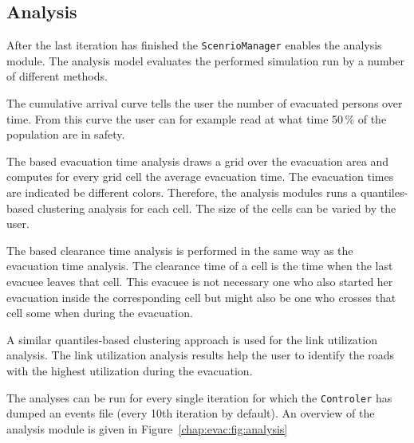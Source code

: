 \subsection{Analysis}
After the last iteration has finished the \lstinline|ScenrioManager| enables the analysis module. The analysis model evaluates the performed simulation run by a number of different methods. 
\begin{compactitem}
\item The cumulative arrival curve tells the user the number of evacuated persons over time. From this curve the user can for example read at what time 50\,\% of the population are in safety.
\item The  based evacuation time analysis draws a grid over the evacuation area and computes for every grid cell the average evacuation time. The evacuation times are indicated be different colors. Therefore, the analysis modules runs a quantiles-based clustering analysis for each cell. The size of the cells can be varied  by the user.
\item The  based clearance time analysis is performed in the same way as the evacuation time  analysis. The clearance time of a cell is the time when the last evacuee leaves that cell. This evacuee is not necessary one who also started her evacuation inside the corresponding cell but might also be one who crosses that cell some when during the evacuation.
\item A similar quantiles-based clustering approach is used for the link utilization analysis. The link utilization analysis results help the user to identify the roads with the highest utilization during the evacuation.
\end{compactitem}
The analyses can be run for every single iteration for which the  \lstinline|Controler| has dumped an events file (every 10th iteration by default). An overview of the analysis module is given in Figure~\ref{chap:evac:fig:analysis}

